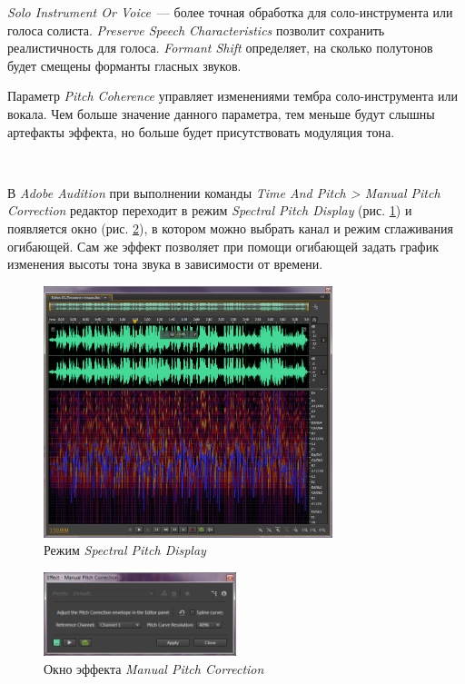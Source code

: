 \documentclass[oneside, final, 14pt]{extreport}
\begin{document}
\textit{Solo Instrument Or Voice}~--- более точная обработка для соло-инструмента или голоса солиста. \textit{Preserve Speech Characteristics} позволит сохранить реалистичность для голоса. \textit{Formant Shift} определяет, на сколько полутонов будет смещены форманты гласных звуков.

Параметр \emph{Pitch Coherence} управляет изменениями тембра соло-инструмента или вокала. Чем больше значение данного параметра, тем меньше будут слышны артефакты эффекта, но больше будет присутствовать модуляция тона.

~

В \emph{Adobe Audition} при выполнении команды \textit{Time And Pitch > Manual Pitch Correction} редактор переходит в режим \emph{Spectral Pitch Display} (рис. \ref{pic-aupitch-01}) и появляется окно (рис. \ref{pic-aupitch-02}), в котором можно выбрать канал и режим сглаживания огибающей. Сам же эффект позволяет при помощи огибающей задать график изменения высоты тона звука в зависимости от времени.

\begin{figure}[h!]
  \centering
  \includegraphics[width=0.75\textwidth]{pic-aupitch-01}
  \caption{Режим \emph{Spectral Pitch Display}}
  \label{pic-aupitch-01}
\end{figure}

\begin{figure}[h!]
  \centering
  \includegraphics[width=0.5\textwidth]{pic-aupitch-02}
  \caption{Окно эффекта \emph{Manual Pitch Correction}}
  \label{pic-aupitch-02}
\end{figure}
\end{document}

